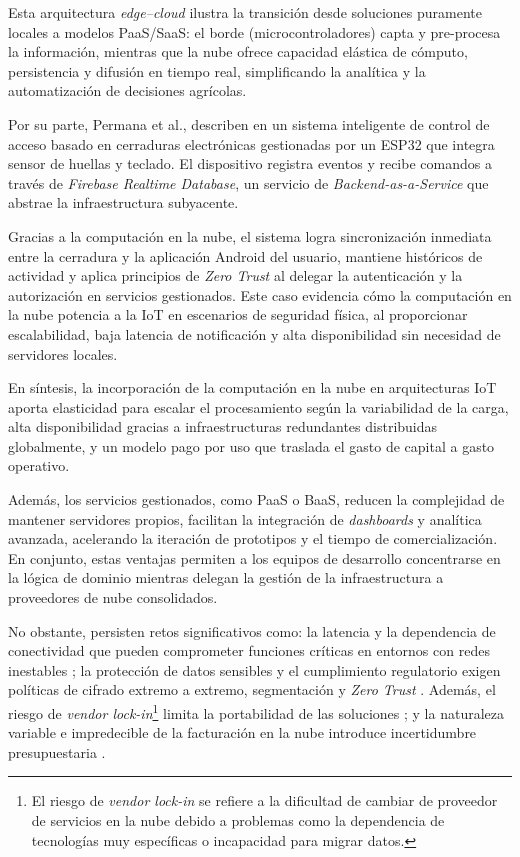 Esta arquitectura \textit{edge–cloud} ilustra la transición desde soluciones puramente locales a modelos PaaS/SaaS: el borde (microcontroladores) capta y pre-procesa la información, mientras que la nube ofrece capacidad elástica de cómputo, persistencia y difusión en tiempo real, simplificando la analítica y la automatización de decisiones agrícolas.

Por su parte, Permana et al., describen en \cite{permana_2024} un sistema inteligente de control de acceso basado en cerraduras electrónicas gestionadas por un ESP32 que integra sensor de huellas y teclado.  El dispositivo registra eventos y recibe comandos a través de \textit{Firebase Realtime Database}, un servicio de \textit{Backend-as-a-Service} que abstrae la infraestructura subyacente.

Gracias a la computación en la nube, el sistema logra sincronización inmediata entre la cerradura y la aplicación Android del usuario, mantiene históricos de actividad y aplica principios de \textit{Zero Trust} al delegar la autenticación y la autorización en servicios gestionados.  Este caso evidencia cómo la computación en la nube potencia a la IoT en escenarios de seguridad física, al proporcionar escalabilidad, baja latencia de notificación y alta disponibilidad sin necesidad de servidores locales.

En síntesis, la incorporación de la computación en la nube en arquitecturas IoT aporta elasticidad para escalar el procesamiento según la variabilidad de la carga, alta disponibilidad gracias a infraestructuras redundantes distribuidas globalmente, y un modelo pago por uso que traslada el gasto de capital a gasto operativo.

Además, los servicios gestionados, como PaaS o BaaS, reducen la complejidad de mantener servidores propios, facilitan la integración de \textit{dashboards} y analítica avanzada, acelerando la iteración de prototipos y el tiempo de comercialización.  En conjunto, estas ventajas permiten a los equipos de desarrollo concentrarse en la lógica de dominio mientras delegan la gestión de la infraestructura a proveedores de nube consolidados.

No obstante, persisten retos significativos como: la latencia y la dependencia de conectividad que pueden comprometer funciones críticas en entornos con redes inestables \cite{andriulo_2024}; la protección de datos sensibles y el cumplimiento regulatorio exigen políticas de cifrado extremo a extremo, segmentación y \textit{Zero Trust} \cite{zanasi_2024}. Además, el riesgo de \textit{vendor lock-in}\footnote{El riesgo de \textit{vendor lock-in} se refiere a la dificultad de cambiar de proveedor de servicios en la nube debido a problemas como la dependencia de tecnologías muy específicas o incapacidad para migrar datos.} limita la portabilidad de las soluciones \cite{alhosban_2024}; y la naturaleza variable e impredecible de la facturación en la nube introduce incertidumbre presupuestaria \cite{deochake_2024}.

